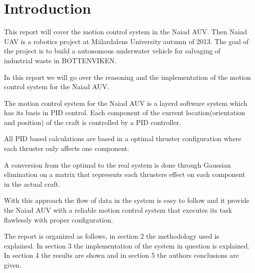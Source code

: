 \section{Introduction}\label{sec:introduction}

This report will cover the motion control system in the Naiad AUV. Then Naiad UAV is a robotics project at Mälardalens University autumn of 2013. The goal of the project is to build a autonomous underwater vehicle for salvaging of industrial waste in BOTTENVIKEN. 

In this report we will go over the reasoning and the implementation of the motion control system for the Naiad AUV. 

The motion control system for the Naiad AUV is a layerd software system which has its basis in PID control. Each component of the current location(orientation and position) of the craft is controlled by a PID controller. 

All PID based calculations are based in a optimal thruster configuration where each thruster only affects one component.

A conversion from the optimal to the real system is done through Gaussian elimination on a matrix that represents each thrusters effect on each component in the actual craft.

With this approach the flow of data in the system is easy to follow and it provide the Naiad AUV with a reliable motion control system that executes its task flawlessly with proper configuration.

The report is organized as follows, in section 2 the methodology used is explained. In section 3 the implementation of the system in question is explained. In section 4 the results are shown and in section 5 the authors conclusions are given. 
